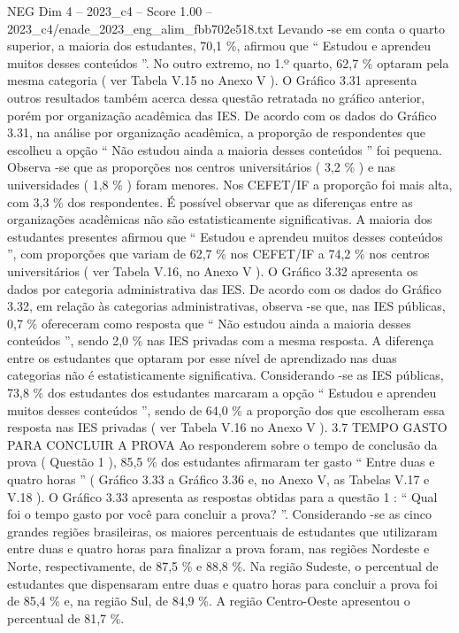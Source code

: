 \begin{textsample}{NEG Dim 4 – 2023\_c4 – Score 1.00 – 2023\_c4/enade\_2023\_eng\_alim\_fbb702e518.txt}
Levando -se em conta o quarto superior, a maioria dos estudantes, 70,1 \%, afirmou que “ Estudou e aprendeu muitos desses conteúdos ”.
No outro extremo, no 1.º quarto, 62,7 \% optaram pela mesma categoria ( ver Tabela V.15 no Anexo V ).
O Gráfico 3.31 apresenta outros resultados também acerca dessa questão retratada no gráfico anterior, porém por organização acadêmica das IES.
De acordo com os dados do Gráfico 3.31, na análise por organização acadêmica, a proporção de respondentes que escolheu a opção “ Não estudou ainda a maioria desses conteúdos ” foi pequena.
Observa -se que as proporções nos centros universitários ( 3,2 \% ) e nas universidades ( 1,8 \% ) foram menores.
Nos CEFET/IF a proporção foi mais alta, com 3,3 \% dos respondentes.
É possível observar que as diferenças entre as organizações acadêmicas não são estatisticamente significativas.
A maioria dos estudantes presentes afirmou que “ Estudou e aprendeu muitos desses conteúdos ”, com proporções que variam de 62,7 \% nos CEFET/IF a 74,2 \% nos centros universitários ( ver Tabela V.16, no Anexo V ).
O Gráfico 3.32 apresenta os dados por categoria administrativa das IES.
De acordo com os dados do Gráfico 3.32, em relação às categorias administrativas, observa -se que, nas IES públicas, 0,7 \% ofereceram como resposta que “ Não estudou ainda a maioria desses conteúdos ”, sendo 2,0 \% nas IES privadas com a mesma resposta.
A diferença entre os estudantes que optaram por esse nível de aprendizado nas duas categorias não é estatisticamente significativa.
Considerando -se as IES públicas, 73,8 \% dos estudantes dos estudantes marcaram a opção “ Estudou e aprendeu muitos desses conteúdos ”, sendo de 64,0 \% a proporção dos que escolheram essa resposta nas IES privadas ( ver Tabela V.16 no Anexo V ). 3.7 TEMPO GASTO PARA CONCLUIR A PROVA Ao responderem sobre o tempo de conclusão da prova ( Questão 1 ), 85,5 \% dos estudantes afirmaram ter gasto “ Entre duas e quatro horas ” ( Gráfico 3.33 a Gráfico 3.36 e, no Anexo V, as Tabelas V.17 e V.18 ).
O Gráfico 3.33 apresenta as respostas obtidas para a questão 1 : “ Qual foi o tempo gasto por você para concluir a prova? ”.
Considerando -se as cinco grandes regiões brasileiras, os maiores percentuais de estudantes que utilizaram entre duas e quatro horas para finalizar a prova foram, nas regiões Nordeste e Norte, respectivamente, de 87,5 \% e 88,8 \%.
Na região Sudeste, o percentual de estudantes que dispensaram entre duas e quatro horas para concluir a prova foi de 85,4 \% e, na região Sul, de 84,9 \%.
A região Centro-Oeste apresentou o percentual de 81,7 \%.

\end{textsample}
